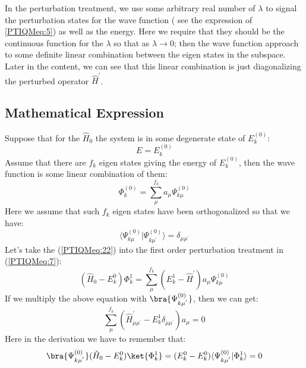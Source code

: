 In the perturbation treatment, we use some arbitrary real number of
$\lambda$ to signal the perturbation states for the wave function (
see the expression of \ref{PTIQMeq:5}) as well as the energy. Here
we require that they should be the continuous function for the
$\lambda$ so that as $\lambda\rightarrow 0$; then the wave function
approach to some definite linear combination between the eigen
states in the subspace. Later in the content, we can see that this
linear combination is just diagonalizing the perturbed operator
$\hat{H}^{'}$.

\subsection{Mathematical Expression}
%
%
%
Suppose that for the $\hat{H}_{0}$ the system is in some degenerate
state of $E_{k}^{(0)}$:
\begin{equation}\label{}
E = E_{k}^{(0)}
\end{equation}
Assume that there are $f_{k}$ eigen states giving the energy of
$E_{k}^{(0)}$, then the wave function is some linear combination of
them:
\begin{equation}\label{PTIQMeq:22}
\Phi^{(0)}_{k} = \sum_{\mu}^{f_{k}}a_{\mu}\Psi_{k\mu}^{(0)}
\end{equation}
Here we assume that such $f_{k}$ eigen states have been
orthogonalized so that we have:
\begin{equation}\label{}
\langle\Psi_{k\mu}^{(0)}|\Psi_{k\mu^{'}}^{(0)}\rangle =
\delta_{\mu\mu^{'}}
\end{equation}
Let's take the (\ref{PTIQMeq:22}) into the first order perturbation
treatment in (\ref{PTIQMeq:7}):
\begin{equation}\label{}
(\hat{H}_{0} - E^{0}_{k})\Phi^{1}_{k} = \sum_{\mu}^{f_{k}}(E^{1}_{k}
- \hat{H}^{'})a_{\mu}\Psi_{k\mu}^{(0)}
\end{equation}
If we multiply the above equation with
$\bra{\Psi_{k\mu^{'}}^{(0)}}$, then we can get:
\begin{equation}\label{PTIQMeq:23}
\sum_{\mu}^{f_{k}}(\hat{H}^{'}_{\mu\mu^{'}} -
E^{1}_{k}\delta_{\mu\mu^{'}})a_{\mu} = 0
\end{equation}
Here in the derivation we have to remember that:
\begin{equation}\label{}
\bra{\Psi_{k\mu^{'}}^{(0)}}(\hat{H}_{0} -
E^{0}_{k})\ket{\Phi^{1}_{k}} = (E^{0}_{k} -
E^{0}_{k})\langle\Psi_{k\mu^{'}}^{(0)}|\Phi^{1}_{k}\rangle = 0
\end{equation}

